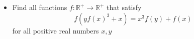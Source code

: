 \documentclass[11pt]{scrartcl}
\begin{document}
\begin{itemize}[label=,itemsep=0.4em,leftmargin=0em]
\begin{comment}
        Therefore, the only function that satisfies is $\boxed{f(x) = x, \xro}$.

    \end{comment}

    \item \begin{btvn}
        Find all functions $f: \mathbb{R^+} \to \mathbb{R^+}$ that satisfy
        \[
        f\left(y f(x)^3+x\right)=x^3 f(y)+f(x)\tag{1}
        \]
        for all positive real numbers $x,y$
    \end{btvn}
    \begin{comment}
        Denote $P(x,y)$ as the substitution into $(1)$.
        
        \vocab{Claim 1:} $f$ is strictly increasing on $\mathbb{R^+}$. 
        \begin{pro}
            From $(1)$ we have 
        \[
            f(yf(x)^3) > f(x), \xyro \tag{2}
        \]
        From $(2)$, substituting $P\left(x,\frac{y}{f(x)^3}\right)$ we get $f(x + y) > f(x), \xyro$. Hence, $f$ is strictly increasing, so $f$ is also injective on $\mathbb{R^+}$.
        \end{pro}

        \vocab{Claim 2:} $\blim_{x \to 0}f(x) = 0$. 
        \begin{pro}
            Since $f$ is strictly increasing and $f(x) > 0$, there must exist $L = \blim_{x \to 0}f(x)$, with $f(x) > L, \xro$. We have 
            \[
            f(yL^3) < f(yf(x)^3 + x) = x^3f(y) + f(x), \xyro
            \]
            Letting $x \to 0^+$ gives $f(yL^3) \leq L, \yro$. Therefore, $yL^3 = 0$ or $L = 0$.
            
        \end{pro}
        \vocab{Claim 3:} $f$ is continuous on $\mathbb{R^+}$. 
        \begin{pro}
            We have $f(yf(x)^3 + x) - f(x) = x^3f(y), \xyro$. Set $h = yf(x)^3$, let $x = x_0 > 0$ be arbitrary, and as $y \to 0^+$, $h \to 0^+$, we get 
            \[
                \blim_{h \to 0} f(x_0 + h) - f(x_0) =  f(x_0) - f(x_0) = 0
            \]
            Hence, $f$ is continuous on $\mathbb{R^+}$.
        \end{pro}
        
        \vocab{Claim 4:} $f$ is bijective on $\mathbb{R^+}$
        \begin{pro}
            Indeed, from $(1)$ as $x \to +\infty$ we get $\blim_{x \to +\infty} f(x) = +\infty$. Since $f$ is continuous and unbounded above, $f$ is surjective. Therefore, $f$ is bijective on $\mathbb{R^+}$.
        \end{pro}
        \vocab{Claim 5:} $f(1) = 1$. 
        \begin{pro}
            Assume $f(1) < 1$, then $P\left(1,\frac{1}{1-f(1)^3}\right)$ implies $f(1) = 0$, which is absurd.


\end{comment}
\end{itemize}
\end{document}

